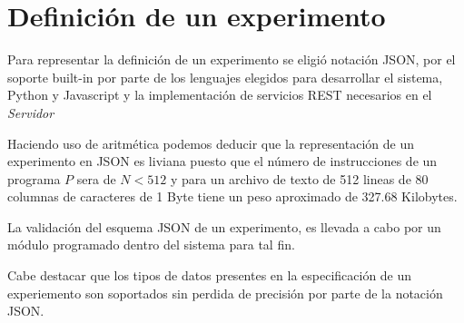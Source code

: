 \section{Definici\'on de un experimento}

Para representar la definici\'on de un experimento se eligi\'o notaci\'on JSON, 
por el soporte built-in por parte de los lenguajes elegidos para desarrollar el sistema, 
Python y Javascript y la implementaci\'on de servicios REST necesarios en el \textit{Servidor}

Haciendo uso de aritm\'etica podemos deducir que la representaci\'on de un experimento en JSON
es liviana puesto que el n\'umero de instrucciones de un programa \(P\) sera de \(N < 512 \) 
y para un archivo de texto de 512 lineas de 80 columnas de caracteres de 1 Byte 
tiene un peso aproximado de 327.68 Kilobytes.

La validaci\'on del esquema JSON de un experimento, es llevada a cabo por un m\'odulo programado
dentro del sistema para tal fin.

Cabe destacar que los tipos de datos presentes en la especificaci\'on de un experiemento son
soportados sin perdida de precisi\'on por parte de la notaci\'on JSON.

\newpage

